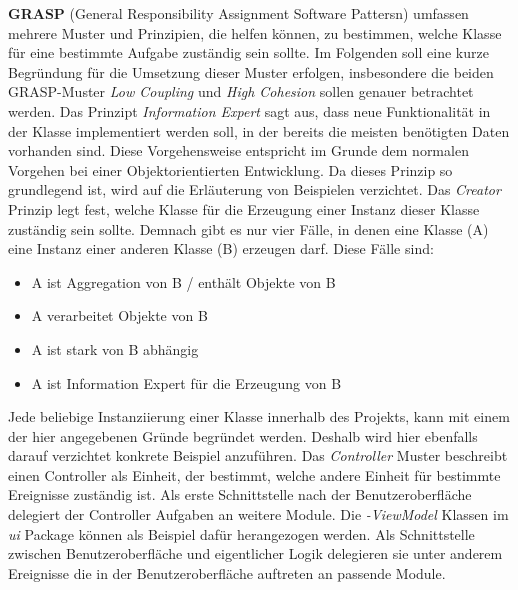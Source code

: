 \textbf{GRASP} (General Responsibility Assignment Software Pattersn) umfassen mehrere Muster und Prinzipien, die helfen können, zu bestimmen, welche Klasse für eine bestimmte Aufgabe zuständig sein sollte.
Im Folgenden soll eine kurze Begründung für die Umsetzung dieser Muster erfolgen, insbesondere die beiden GRASP-Muster \textit{Low Coupling} und \textit{High Cohesion} sollen genauer betrachtet werden.
\newline
\newline
Das Prinzipt \textit{Information Expert} sagt aus, dass neue Funktionalität in der Klasse implementiert werden soll, in der bereits die meisten benötigten Daten vorhanden sind.
Diese Vorgehensweise entspricht im Grunde dem normalen Vorgehen bei einer Objektorientierten Entwicklung.
Da dieses Prinzip so grundlegend ist, wird auf die Erläuterung von Beispielen verzichtet.
\newline
\newline
Das \textit{Creator} Prinzip legt fest, welche Klasse für die Erzeugung einer Instanz dieser Klasse zuständig sein sollte.
Demnach gibt es nur vier Fälle, in denen eine Klasse (A) eine Instanz einer anderen Klasse (B) erzeugen darf.
Diese Fälle sind:
\begin{itemize}
    \item{A ist Aggregation von B / enthält Objekte von B}
    \item{A verarbeitet Objekte von B}
    \item{A ist stark von B abhängig}
    \item{A ist Information Expert für die Erzeugung von B}
\end{itemize}
Jede beliebige Instanziierung einer Klasse innerhalb des Projekts, kann mit einem der hier angegebenen Gründe begründet werden.
Deshalb wird hier ebenfalls darauf verzichtet konkrete Beispiel anzuführen.
\newline
\newline
Das \textit{Controller} Muster beschreibt einen Controller als Einheit, der bestimmt, welche andere Einheit für bestimmte Ereignisse zuständig ist.
Als erste Schnittstelle nach der Benutzeroberfläche delegiert der Controller Aufgaben an weitere Module.
Die \textit{-ViewModel} Klassen im \textit{ui} Package können als Beispiel dafür herangezogen werden.
Als Schnittstelle zwischen Benutzeroberfläche und eigentlicher Logik delegieren sie unter anderem Ereignisse die in der Benutzeroberfläche auftreten an passende Module.
